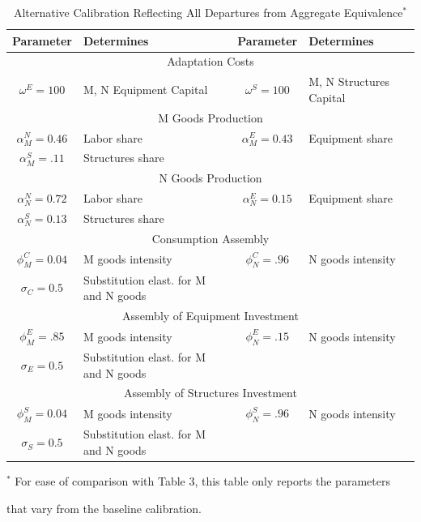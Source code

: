 \documentclass[12pt,fleqn]{article}
\renewcommand{\baselinestretch}{1.5}
\begin{document}
\begin{table}[tbp]
\caption{Alternative Calibration Reflecting All Departures from
Aggregate Equivalence$^*$}
\label{table_changed_parameters} \center \renewcommand{%
\baselinestretch}{1.1} \footnotesize
\begin{tabular}{|c|l|c|l|}
\hline\hline Parameter & Determines & Parameter & Determines \\
\hline \multicolumn{4}{c}{Adaptation Costs} \\ \hline $\omega^E =
100 $ & M, N Equipment Capital & $\omega^S = 100 $ & M, N Structures
Capital \\ \hline \multicolumn{4}{c}{M Goods Production} \\ \hline
$\alpha^N_M = 0.46 $ & Labor share & $\alpha^E_M = 0.43 $ &
Equipment share
\\
$\alpha^S_M =.11 $ & Structures share &  &  \\ \hline
\multicolumn{4}{c}{N Goods Production} \\ \hline $\alpha^N_N = 0.72
$ & Labor share & $\alpha^E_N = 0.15$ & Equipment share
\\
$\alpha^S_N = 0.13 $ & Structures share &  &  \\ \hline
\multicolumn{4}{c}{Consumption Assembly} \\
\hline $\phi^C_M = 0.04$ & M goods intensity & $\phi^C_N = .96$ & N
goods intensity
\\
$\sigma_C = 0.5$ & Substitution elast. for M and N goods &  &  \\

\hline \multicolumn{4}{c}{Assembly of Equipment Investment} \\
\hline $\phi^E_M = .85$ & M goods intensity & $\phi^E_N = .15$ & N
goods intensity
\\
$\sigma_E = 0.5$ & Substitution elast. for M and N goods &  &  \\

\hline \multicolumn{4}{c}{Assembly of Structures Investment} \\
\hline $\phi^S_M = 0.04$ & M goods intensity & $\phi^S_N = .96$ & N
goods intensity
\\
$\sigma_S = 0.5 $ & Substitution elast. for M and N goods &  &
\\\hline\hline
\end{tabular}
\flushleft
\par
{\normalsize {\footnotesize \hspace{2.5cm} $^*$ For ease of
comparison with Table 3, this table only reports the parameters }  }
\par
{\footnotesize \hspace{2.5cm} that vary from the baseline
calibration. }
\end{table}
\end{document}
